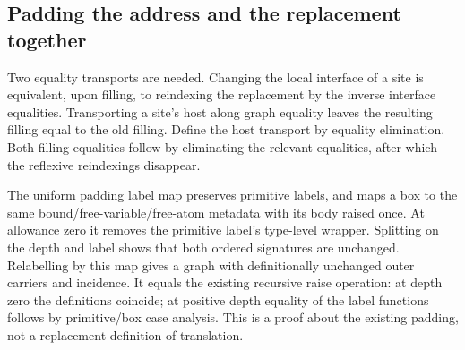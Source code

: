 






\subsection{Padding the address and the replacement together}

Two equality transports are needed. Changing the local interface of a site
is equivalent, upon filling, to reindexing the replacement by the inverse
interface equalities. Transporting a site's host along graph equality leaves
the resulting filling equal to the old filling. Define the host transport by
equality elimination. Both filling equalities follow by eliminating the
relevant equalities, after which the reflexive reindexings disappear.





The uniform padding label map preserves primitive labels, and maps a box to
the same bound/free-variable/free-atom metadata with its body raised once.
At allowance zero it removes the primitive label's type-level wrapper. Splitting
on the depth and label shows that both ordered signatures are unchanged.
Relabelling by this map gives a graph with definitionally unchanged outer
carriers and incidence. It equals the existing recursive raise operation:
at depth zero the definitions coincide; at positive depth equality of the
label functions follows by primitive/box case analysis. This is a proof about
the existing padding, not a replacement definition of translation.


